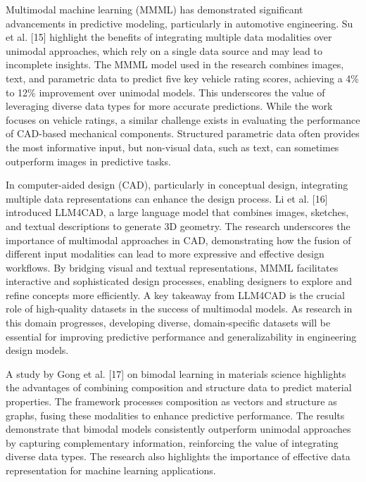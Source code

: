 \documentclass[11pt]{article}
\begin{document}
Multimodal machine learning (MMML) has demonstrated significant
advancements in predictive modeling, particularly in automotive
engineering. Su et al. {[}15{]} highlight the benefits of integrating
multiple data modalities over unimodal approaches, which rely on a
single data source and may lead to incomplete insights. The MMML model
used in the research combines images, text, and parametric data to
predict five key vehicle rating scores, achieving a 4\% to 12\%
improvement over unimodal models. This underscores the value of
leveraging diverse data types for more accurate predictions. While the
work focuses on vehicle ratings, a similar challenge exists in
evaluating the performance of CAD-based mechanical components.
Structured parametric data often provides the most informative input,
but non-visual data, such as text, can sometimes outperform images in
predictive tasks.

In computer-aided design (CAD), particularly in conceptual design,
integrating multiple data representations can enhance the design
process. Li et al. {[}16{]} introduced LLM4CAD, a large language model
that combines images, sketches, and textual descriptions to generate 3D
geometry. The research underscores the importance of multimodal
approaches in CAD, demonstrating how the fusion of different input
modalities can lead to more expressive and effective design workflows.
By bridging visual and textual representations, MMML facilitates
interactive and sophisticated design processes, enabling designers to
explore and refine concepts more efficiently. A key takeaway from
LLM4CAD is the crucial role of high-quality datasets in the success of
multimodal models. As research in this domain progresses, developing
diverse, domain-specific datasets will be essential for improving
predictive performance and generalizability in engineering design
models.

A study by Gong et al. {[}17{]} on bimodal learning in materials science
highlights the advantages of combining composition and structure data to
predict material properties. The framework processes composition as
vectors and structure as graphs, fusing these modalities to enhance
predictive performance. The results demonstrate that bimodal models
consistently outperform unimodal approaches by capturing complementary
information, reinforcing the value of integrating diverse data types.
The research also highlights the importance of effective data
representation for machine learning applications.
\end{document}
